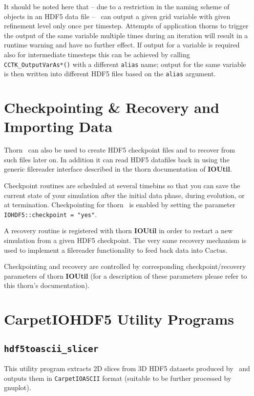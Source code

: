 \documentclass{article}
\begin{document}
It should be noted here that -- due to a restriction in the naming scheme of
objects in an HDF5 data file -- \ThisThorn\ can output a given grid variable
with given refinement level only once per timestep. Attempts of application
thorns to trigger the output of the same variable multiple times during an iteration
will result in a runtime warning and have no further effect.
If output for a variable is required also for intermediate timesteps
this can be achieved by calling {\tt CCTK\_OutputVarAs*()} with a different
{\tt alias} name; output for the same variable is then written into
different HDF5 files based on the {\tt alias} argument.


\section{Checkpointing \& Recovery and Importing Data}

Thorn \ThisThorn\ can also be used to create HDF5 checkpoint files and
to recover from such files later on. In addition it can read HDF5 datafiles
back in using the generic filereader interface described in the thorn
documentation of {\bf IOUtil}.

Checkpoint routines are scheduled at several timebins so that you can save
the current state of your simulation after the initial data phase,
during evolution, or at termination. Checkpointing for thorn \ThisThorn\ 
is enabled by setting the parameter {\tt IOHDF5::checkpoint = "yes"}.

A recovery routine is registered with thorn {\bf IOUtil} in order to restart
a new simulation from a given HDF5 checkpoint.
The very same recovery mechanism is used to implement a filereader
functionality to feed back data into Cactus.

Checkpointing and recovery are controlled by corresponding checkpoint/recovery
parameters of thorn {\bf IOUtil} (for a description of these parameters please
refer to this thorn's documentation).


\section{CarpetIOHDF5 Utility Programs}

\subsection{{\tt hdf5toascii\_slicer}}

This utility program extracts 2D slices from 3D HDF5
datasets produced by \ThisThorn\ and outputs them in {\tt CarpetIOASCII} format
(suitable to be further processed by gnuplot).
\end{document}
